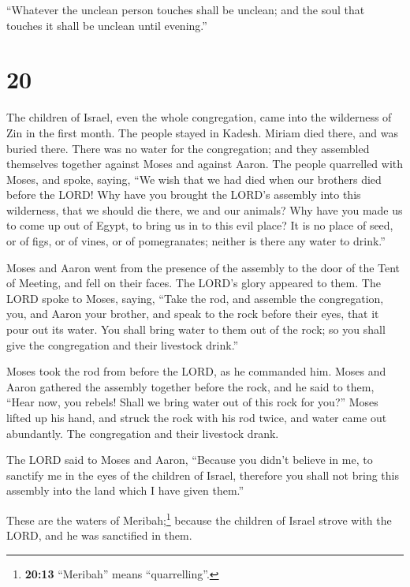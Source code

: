  ``Whatever the unclean person touches shall be unclean;
and the soul that touches it shall be unclean until evening.''

\hypertarget{section-19}{%
\section{20}\label{section-19}}

 The children of Israel, even the whole congregation, came
into the wilderness of Zin in the first month. The people stayed in
Kadesh. Miriam died there, and was buried there.  There
was no water for the congregation; and they assembled themselves
together against Moses and against Aaron.  The people
quarrelled with Moses, and spoke, saying, ``We wish that we had died
when our brothers died before the LORD!  Why have you
brought the LORD's assembly into this wilderness, that we should die
there, we and our animals?  Why have you made us to come
up out of Egypt, to bring us in to this evil place? It is no place of
seed, or of figs, or of vines, or of pomegranates; neither is there any
water to drink.''

 Moses and Aaron went from the presence of the assembly to
the door of the Tent of Meeting, and fell on their faces. The LORD's
glory appeared to them.  The LORD spoke to Moses, saying,
 ``Take the rod, and assemble the congregation, you, and
Aaron your brother, and speak to the rock before their eyes, that it
pour out its water. You shall bring water to them out of the rock; so
you shall give the congregation and their livestock drink.''

 Moses took the rod from before the LORD, as he commanded
him.  Moses and Aaron gathered the assembly together
before the rock, and he said to them, ``Hear now, you rebels! Shall we
bring water out of this rock for you?''  Moses lifted up
his hand, and struck the rock with his rod twice, and water came out
abundantly. The congregation and their livestock drank.

 The LORD said to Moses and Aaron, ``Because you didn't
believe in me, to sanctify me in the eyes of the children of Israel,
therefore you shall not bring this assembly into the land which I have
given them.''

 These are the waters of Meribah;\footnote{\textbf{20:13}
  ``Meribah'' means ``quarrelling''.} because the children of Israel
strove with the LORD, and he was sanctified in them.

